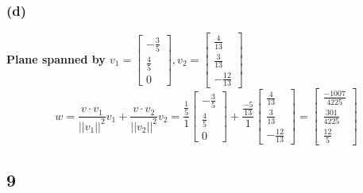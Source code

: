 \documentclass[10pt,letterpaper]{article}
\begin{document}
		\subsubsection*{(d)} \textbf{Plane spanned by $v_1 = \begin{bmatrix}
			-\frac{3}{5} \\ \frac{4}{5} \\ 0
			\end{bmatrix}, v_2 = \begin{bmatrix}
			\frac{4}{13} \\ \frac{3}{13} \\ -\frac{12}{13}
			\end{bmatrix}$} 
		$$
		w = \frac{v \cdot v_1}{||v_1||^2} v_1 + \frac{v \cdot v_2}{||v_2||^2} v_2 = \frac{\frac{1}{5}}{1} \begin{bmatrix}
		-\frac{3}{5} \\ \frac{4}{5} \\ 0
		\end{bmatrix} + \frac{\frac{-5}{13}}{1} \begin{bmatrix}
		\frac{4}{13} \\ \frac{3}{13} \\ -\frac{12}{13}
		\end{bmatrix} = \boxed{ \begin{bmatrix}
			\frac{-1007}{4225} \\ \frac{301}{4225} \\ \frac{12}{5}
			\end{bmatrix} }
		$$
	\subsection*{9} 
\end{document}
